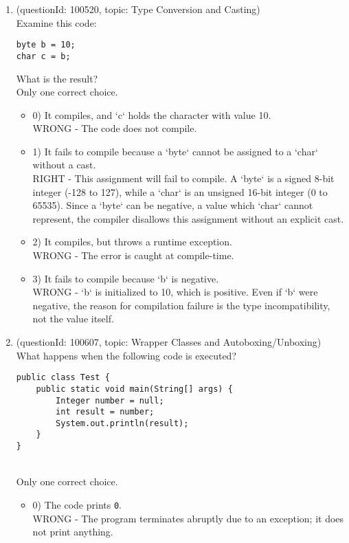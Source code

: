 \documentclass[12pt]{article}
\begin{document}
\begin{enumerate}[label=(\arabic*)]
\begin{itemize}
\end{itemize}
\item (questionId: 100520, topic: Type Conversion and Casting) \\ 
Examine this code:
\begin{verbatim}
byte b = 10;
char c = b;
\end{verbatim}
What is the result?
\\ \noindent Only one correct choice. 
\begin{itemize}
\item 0) It compiles, and `c` holds the character with value 10.
 \\ 
WRONG - The code does not compile.

\item 1) It fails to compile because a `byte` cannot be assigned to a `char` without a cast.
 \\ 
RIGHT - This assignment will fail to compile. A `byte` is a signed 8-bit integer (-128 to 127), while a `char` is an unsigned 16-bit integer (0 to 65535). Since a `byte` can be negative, a value which `char` cannot represent, the compiler disallows this assignment without an explicit cast.

\item 2) It compiles, but throws a runtime exception.
 \\ 
WRONG - The error is caught at compile-time.

\item 3) It fails to compile because `b` is negative.
 \\ 
WRONG - `b` is initialized to 10, which is positive. Even if `b` were negative, the reason for compilation failure is the type incompatibility, not the value itself.

\end{itemize}
\item (questionId: 100607, topic: Wrapper Classes and Autoboxing/Unboxing) \\ 
What happens when the following code is executed?\n\begin{verbatim}
public class Test {
    public static void main(String[] args) {
        Integer number = null;
        int result = number;
        System.out.println(result);
    }
}
\end{verbatim}
\\ \noindent Only one correct choice. 
\begin{itemize}
\item 0) The code prints \verb|0|.
 \\ 
WRONG - The program terminates abruptly due to an exception; it does not print anything.


\end{itemize}
\end{enumerate}
\end{document}

